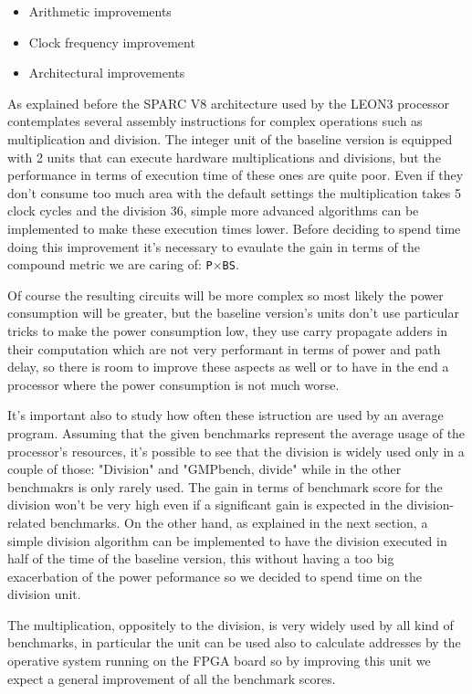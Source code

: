 \begin{itemize}
  \item Arithmetic improvements
  \item Clock frequency improvement
  \item Architectural improvements
\end{itemize}

As explained before the SPARC V8 architecture used by the LEON3 processor contemplates several assembly instructions for complex operations such as multiplication and division.
The integer unit of the baseline version is equipped with 2 units that can execute hardware multiplications and divisions, but the performance in terms of execution time of these ones are quite poor.
Even if they don't consume too much area with the default settings the multiplication takes 5 clock cycles and the division 36, simple more advanced algorithms can be implemented to make these execution times lower.
Before deciding to spend time doing this improvement it's necessary to evaulate the gain in terms of the compound metric we are caring of: \texttt{P}$\times$\texttt{BS}.

Of course the resulting circuits will be more complex so most likely the power consumption will be greater, but the baseline version's units don't use particular tricks to make the power consumption low, they use carry propagate adders in their computation which are not very performant in terms of power and path delay, so there is room to improve these aspects as well or to have in the end a processor where the power consumption is not much worse.

It's important also to study how often these istruction are used by an average program.
Assuming that the given benchmarks represent the average usage of the processor's resources, it's possible to see that the division is widely used only in a couple of those: "Division" and "GMPbench, divide" while in the other benchmakrs is only rarely used.
The gain in terms of benchmark score for the division won't be very high even if a significant  gain is expected in the division-related benchmarks.
On the other hand, as explained in the next section, a simple division algorithm can be implemented to have the division executed in half of the time of the baseline version, this without having a too big exacerbation of the power peformance so we decided to spend time on the division unit.

The multiplication, oppositely to the division, is very widely used by all kind of benchmarks, in particular the unit can be used also to calculate addresses by the operative system running on the FPGA board so by improving this unit we expect a general improvement of all the benchmark scores. 

